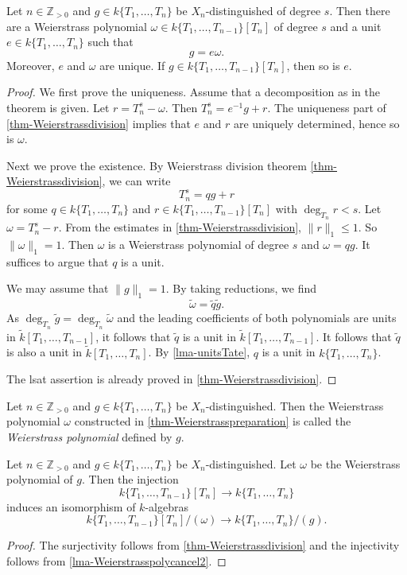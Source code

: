 \begin{thm}\label{thm-Weierstrasspreparation}
    Let $n\in \mathbb{Z}_{>0}$ and $g\in k\{T_1,\ldots,T_{n}\}$ be $X_n$-distinguished of degree $s$. Then there are a Weierstrass polynomial $\omega\in k\{T_1,\ldots,T_{n-1}\}[T_n]$ of degree $s$ and a unit $e\in k\{T_1,\ldots,T_{n}\}$ such that 
    \[
        g=e\omega.
    \]
    Moreover, $e$ and $\omega$ are unique. If $g\in k\{T_1,\ldots,T_{n-1}\}[T_n]$, then so is $e$.
\end{thm}
\begin{proof}
    We first prove the uniqueness. Assume that a decomposition as in the theorem is given. Let $r=T_n^s-\omega$. Then $T_n^s=e^{-1}g+r$. The uniqueness part of \cref{thm-Weierstrassdivision} implies that $e$ and $r$ are uniquely determined, hence so is $\omega$.

    Next we prove the existence.
    By Weierstrass division theorem \cref{thm-Weierstrassdivision}, we can write
    \[
          T_n^s=q g+r
    \]
    for some $q\in k\{T_1,\ldots,T_{n}\}$ and $r\in k\{T_1,\ldots,T_{n-1}\}[T_n]$ with $\deg_{T_n} r<s$. Let $\omega=T_n^s-r$. From the estimates in \cref{thm-Weierstrassdivision}, $\|r\|_1\leq 1$. So $\|\omega\|_1=1$.
    Then $\omega$ is a Weierstrass polynomial of degree $s$ and $\omega=q g$.
    It suffices to argue that $q$ is a unit. 

    We may assume that $\|g\|_1=1$. By taking reductions, we find
    \[
        \tilde{\omega}=\tilde{q}\tilde{g}.  
    \]
    As $\deg_{T_n}\tilde{g}=\deg_{T_n}\tilde{\omega}$ and the leading coefficients of both polynomials are units in $\tilde{k}[T_1,\ldots,T_{n-1}]$, it follows that $\tilde{q}$ is a unit in $\tilde{k}[T_1,\ldots,T_{n-1}]$. It follows that $\tilde{q}$ is also a unit in $\tilde{k}[T_1,\ldots,T_{n}]$. By \cref{lma-unitsTate}, $q$ is a unit in $k\{T_1,\ldots,T_{n}\}$.

    The lsat assertion is already proved in \cref{thm-Weierstrassdivision}.

\end{proof}

\begin{definition}
    Let $n\in \mathbb{Z}_{>0}$ and $g\in k\{T_1,\ldots,T_{n}\}$ be $X_n$-distinguished. Then the Weierstrass polynomial $\omega$ constructed in \cref{thm-Weierstrasspreparation} is called the \emph{Weierstrass polynomial} defined by $g$.
\end{definition}

\begin{corollary}\label{cor:quotientreplacedbyWeie}
    Let $n\in \mathbb{Z}_{>0}$ and $g\in k\{T_1,\ldots,T_{n}\}$ be $X_n$-distinguished. Let $\omega$ be the Weierstrass polynomial of $g$. Then the injection
    \[
        k\{T_1,\ldots,T_{n-1}\}[T_n]\rightarrow  k\{T_1,\ldots,T_{n}\}
    \]
    induces an isomorphism of $k$-algebras
    \[
        k\{T_1,\ldots,T_{n-1}\}[T_n]/(\omega)\rightarrow  k\{T_1,\ldots,T_{n}\}/(g).
    \]
\end{corollary}
\begin{proof}
    The surjectivity follows from \cref{thm-Weierstrassdivision} and the injectivity follows from \cref{lma-Weierstrasspolycancel2}.
\end{proof}

